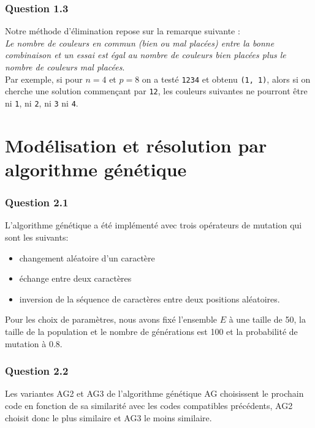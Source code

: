 \documentclass[a4paper, 12pt]{report}
\newcommand{\py}[1]{\texttt{#1}}
\begin{document}
\section*{Question 1.3}

Notre méthode d'élimination repose sur la remarque suivante : \\

\textit{Le nombre de couleurs en commun (bien ou mal placées) entre la bonne combinaison et un essai est égal au nombre de couleurs bien placées plus le nombre de couleurs mal placées}. \\

Par exemple, si pour $n = 4$ et $p = 8$ on a testé \py{1234} et obtenu \py{(1, 1)}, alors si on cherche une solution commençant par \py{12}, les couleurs suivantes ne pourront être ni \py{1}, ni \py{2}, ni \py{3} ni \py{4}.

\part*{Modélisation et résolution par algorithme génétique}

\section*{Question 2.1}

L'algorithme génétique a été implémenté avec trois opérateurs de mutation qui sont les suivants:
\begin{itemize}
	\item changement aléatoire d'un caractère
	\item échange entre deux caractères
	\item inversion de la séquence de caractères entre deux positions aléatoires.
\end{itemize}

Pour les choix de paramètres, nous avons fixé l'ensemble $E$ à une taille de 50, la taille de la population et le nombre de générations est 100 et la probabilité de mutation à 0.8.

\section*{Question 2.2}

Les variantes AG2 et AG3 de l'algorithme génétique AG choisissent le prochain code en fonction de sa similarité avec les codes compatibles précédents, AG2 choisit donc le plus similaire et AG3 le moins similaire. \\
\end{document}
